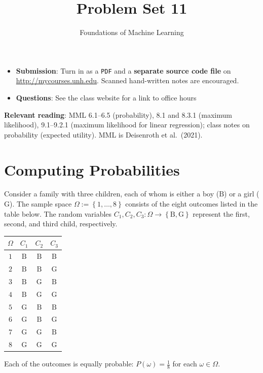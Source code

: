 \documentclass[letterpaper]{article}
\title{Problem Set 11}
\author{Foundations of Machine Learning}
\date{}
\begin{document}
\maketitle

\begin{itemize}
\item \textbf{Submission}: Turn in as a \texttt{PDF} and a \textbf{separate source code file} on \url{http://mycourses.unh.edu}. Scanned hand-written notes are encouraged.
\item \textbf{Questions}: See the class website for a link to office hours
\end{itemize}


\textbf{Relevant reading}: MML 6.1--6.5 (probability), 8.1 and 8.3.1 (maximum likelihood), 9.1--9.2.1 (maximum likelihood for linear regression); class notes on probability (expected utility). MML is Deisenroth et al.\ (2021).

\section{Computing Probabilities}
Consider a family with three children, each of whom is either a boy ($\mathrm{B}$) or a girl ($\mathrm{G}$). The sample space $\Omega := \left\{ 1, \dots, 8 \right\}$ consists of the eight outcomes listed in the table below. The random variables $C_1, C_2, C_3\colon \Omega \to \left\{ \mathrm{B}, \mathrm{G} \right\}$ represent the first, second, and third child, respectively.
\begin{center}
\begin{tabular}{c|ccc}
  $\Omega$ & $C_1$ & $C_2$ & $C_3$ \\
  \hline
  $1$ & $\mathrm{B}$ & $\mathrm{B}$ & $\mathrm{B}$ \\
  $2$ & $\mathrm{B}$ & $\mathrm{B}$ & $\mathrm{G}$ \\
  $3$ & $\mathrm{B}$ & $\mathrm{G}$ & $\mathrm{B}$ \\
  $4$ & $\mathrm{B}$ & $\mathrm{G}$ & $\mathrm{G}$ \\
  $5$ & $\mathrm{G}$ & $\mathrm{B}$ & $\mathrm{B}$ \\
  $6$ & $\mathrm{G}$ & $\mathrm{B}$ & $\mathrm{G}$ \\
  $7$ & $\mathrm{G}$ & $\mathrm{G}$ & $\mathrm{B}$ \\
  $8$ & $\mathrm{G}$ & $\mathrm{G}$ & $\mathrm{G}$ \\
\end{tabular}
\end{center}
Each of the outcomes is equally probable: $P(\omega) = \frac{1}{8}$ for each $\omega\in \Omega$.
\end{document}

